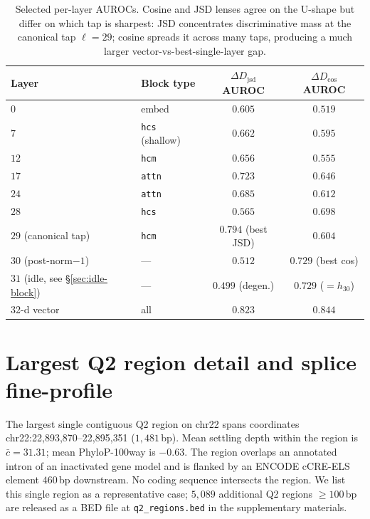 \documentclass[12pt]{article}
\theoremstyle{plain}
\theoremstyle{definition}
\theoremstyle{remark}
\newcommand{\DDcos}{\Delta D_{\cos}}
\newcommand{\DDjsd}{\Delta D_{\mathrm{jsd}}}
\begin{document}
\begin{table}[h]
\caption{Selected per-layer AUROCs. Cosine and JSD lenses agree on the
U-shape but differ on which tap is sharpest: JSD concentrates
discriminative mass at the canonical tap $\ell=29$; cosine spreads it
across many taps, producing a much larger vector-vs-best-single-layer
gap.}
\label{tab:per-layer}
\centering
\small
\begin{tabular}{@{}llcc@{}}
\toprule
Layer & Block type & $\DDjsd$ AUROC & $\DDcos$ AUROC \\
\midrule
$0$  & embed                    & $0.605$ & $0.519$ \\
$7$  & \texttt{hcs} (shallow)   & $0.662$ & $0.595$ \\
$12$ & \texttt{hcm}             & $0.656$ & $0.555$ \\
$17$ & \texttt{attn}            & $0.723$ & $0.646$ \\
$24$ & \texttt{attn}            & $0.685$ & $0.612$ \\
$28$ & \texttt{hcs}             & $0.565$ & $0.698$ \\
$29$ (canonical tap) & \texttt{hcm}
                                & $\mathbf{0.794}$ (best JSD) & $0.604$ \\
$30$ (post-norm$-1$)  & ---     & $0.512$ & $\mathbf{0.729}$ (best cos) \\
$31$ (idle, see \S\ref{sec:idle-block}) & ---
                                & $0.499$ (degen.) & $0.729$ ($=h_{30}$) \\
\midrule
32-d vector & all                 & $0.823$ & $0.844$ \\
\bottomrule
\end{tabular}
\end{table}

\section{Largest Q2 region detail and splice fine-profile}
\label{app:q2-splice-profile}

The largest single contiguous Q2 region on chr22 spans coordinates
chr22:22{,}893{,}870--22{,}895{,}351 ($1{,}481$\,bp). Mean settling
depth within the region is $\bar c = 31.31$; mean PhyloP-100way is
$-0.63$. The region overlaps an annotated intron of an inactivated gene
model and is flanked by an ENCODE cCRE-ELS element $460$\,bp
downstream. No coding sequence intersects the region. We list this
single region as a representative case; $5{,}089$ additional Q2 regions
$\ge 100$\,bp are released as a BED file at \texttt{q2\_regions.bed} in
the supplementary materials.
\end{document}
